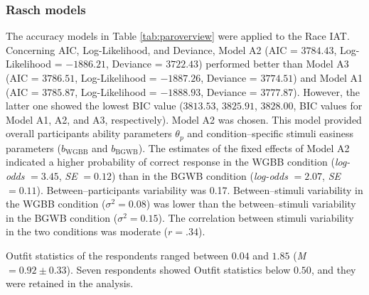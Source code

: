 \documentclass[12pt]{book}
\begin{document}
\subsubsection{Rasch models} 
The accuracy models in Table \ref{tab:paroverview} were applied to the Race IAT.
Concerning AIC, Log-Likelihood, and Deviance, Model A2 (AIC = $3784.43$, Log-Likelihood = $-1886.21$, Deviance = $3722.43$) performed better than Model A3 (AIC = $3786.51$, Log-Likelihood  = $-1887.26$, Deviance  = $3774.51$) and Model A1 (AIC = $3785.87$, Log-Likelihood  = $-1888.93$, Deviance  = $3777.87$). However, the latter one showed the lowest BIC value ($3813.53$, $3825.91$, $3828.00$, BIC values for Model A1, A2, and A3, respectively). Model A2 was chosen. This model provided overall participants ability parameters $\theta_p$ and condition--specific stimuli easiness parameters ($b_{\text{WGBB}}$ and $b_{\text{BGWB}}$).
The estimates of the fixed effects of Model A2 indicated a higher probability of correct response in the WGBB condition (\emph{log-odds} $= 3.45$, \emph{SE} $= 0.12$) than in the BGWB condition (\emph{log-odds} $= 2.07$, \emph{SE} $= 0.11$). Between--participants variability was 0.17. Between--stimuli variability in the WGBB condition ($\sigma^2 = 0.08$) was lower than the between--stimuli variability in the BGWB condition ($\sigma^2 = 0.15$). The correlation between stimuli variability in the two conditions was moderate ($r = .34$). 

Outfit statistics of the respondents ranged between $0.04$ and $1.85$ (\emph{M} $= 0.92 \pm 0.33$). Seven respondents showed Outfit statistics below $0.50$, and they were retained in the analysis.
\end{document}
